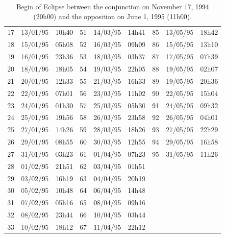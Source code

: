 \documentclass{tufte-handout}
\begin{document}
\begin{table}
\begin{tabular}{lll|lll|lll}
17 & 13/01/95 & 10h40 & 51 & 14/03/95 & 14h41 & 85 & 13/05/95 & 18h42 \\
18 & 15/01/95 & 05h08 & 52 & 16/03/95 & 09h09 & 86 & 15/05/95 & 13h10 \\
19 & 16/01/95 & 23h36 & 53 & 18/03/95 & 03h37 & 87 & 17/05/95 & 07h39 \\
20 & 18/01/96 & 18h05 & 54 & 19/03/95 & 22h05 & 88 & 19/05/95 & 02h07 \\
21 & 20/01/95 & 12h33 & 55 & 21/03/95 & 16h33 & 89 & 19/05/95 & 20h36 \\
22 & 22/01/95 & 07h01 & 56 & 23/03/95 & 11h02 & 90 & 22/05/95 & 15h04 \\
23 & 24/01/95 & 01h30 & 57 & 25/03/95 & 05h30 & 91 & 24/05/95 & 09h32 \\
24 & 25/01/95 & 19h56 & 58 & 26/03/95 & 23h58 & 92 & 26/05/95 & 04h01 \\
25 & 27/01/95 & 14h26 & 59 & 28/03/95 & 18h26 & 93 & 27/05/95 & 22h29 \\
26 & 29/01/95 & 08h55 & 60 & 30/03/95 & 12h55 & 94 & 29/05/95 & 16h58 \\
27 & 31/01/95 & 03h23 & 61 & 01/04/95 & 07h23 & 95 & 31/05/95 & 11h26 \\
28 & 01/02/95 & 21h51 & 62 & 03/04/95 & 01h51 &  & & \\
29 & 03/02/95 & 16h19 & 63 & 04/04/95 & 20h19 &  & & \\
30 & 05/02/95 & 10h48 & 64 & 06/04/95 & 14h48 &  & & \\
31 & 07/02/95 & 05h16 & 65 & 08/04/95 & 09h16 &  & & \\
32 & 08/02/95 & 23h44 & 66 & 10/04/95 & 03h44 &  & & \\
33 & 10/02/95 & 18h12 & 67 & 11/04/95 & 22h12 &  & & \\
\end{tabular}
\caption{ Begin of Eclipse between the conjunction on November 17, 1994 (20h00) and the opposition on June 1, 1995 (11h00). }
\end{table}
\end{document}
